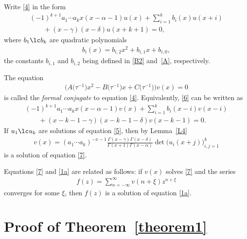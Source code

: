 Write \eqref{4} in the form
\begin{gather}
(-1)^{k+1}a_1\cdots a_k x(x-\alpha-1) u(x) +\sum_{i=1}^k b_i(x) u(x+i) \nonumber\\
\qquad{} +(x-\gamma)(x-\delta) u(x+k+1) = 0, \label{5}
\end{gather}
where $b_1\lc b_k$ are quadratic polynomials
\begin{gather*}%
b_i(x)=b_{i,2}x^2+b_{i,1}x+b_{i,0},
\end{gather*}
the constants $b_{i,1}$ and $b_{i,2}$ being defined in \eqref{B2} and~\eqref{A}, respectively.

The equation
\begin{gather}
\big(A\big(\tau^{-1}\big) x^2-B\big(\tau^{-1}\big) x+C\big(\tau^{-1}\big)\big)v(x)=0\label{6}
\end{gather}
is called the {\it formal conjugate} to equation \eqref{4}. Equivalently, \eqref{6} can be written as
\begin{gather}
(-1)^{k+1}a_1\cdots a_k x(x-\alpha-1) v(x) +\sum_{i=1}^k b_i(x-i) v(x-i)\nonumber\\
\qquad{} + (x-k-1-\gamma)(x-k-1-\delta) v(x-k-1) = 0. \label{7}
\end{gather}
If $u_1\lc u_k$ are solutions of equation \eqref{5}, then by Lemma~\ref{L4}
\begin{gather}
v(x) = (a_1\cdots a_k)^{-x-1} \frac{\Gamma(x-\gamma) \Gamma(x-\delta)}{\Gamma(x+1) \Gamma(x-\alpha)}\det\bigl(u_i(x+j)\bigr)_{i,j=1}^k\label{8}
\end{gather}
is a solution of equation \eqref{7}.

Equations \eqref{7} and \eqref{1a} are related as follows: if $v(x)$ solves \eqref{7} and the series
\begin{gather}
f(z) = \sum_{n=-\infty}^\infty v(n+\xi) z^{n+\xi}\label{8a}
\end{gather}
converges for some $\xi $, then $f(z)$ is a solution of equation \eqref{1a}.

\section{Proof of Theorem~\ref{theorem1}}\label{section5}

